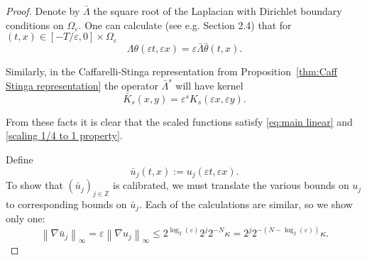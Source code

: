 \documentclass[11pt]{amsart}
\theoremstyle{remark}
\theoremstyle{definition}
\newcommand{\Z}{\mathbb{Z}}
\newcommand{\eps}{\varepsilon}
\newcommand{\norm}[1]{\left\lVert#1\right\rVert}
\newcommand{\del}{\partial}
\newcommand{\grad}{\nabla}
\begin{document}
\begin{proof}
Denote by $\bar{\Lambda}$ the square root of the Laplacian with Dirichlet boundary conditions on $\Omega_\eps$.  One can calculate (see e.g. \cite{CaSt} Section 2.4) that for $(t,x) \in [-T/\eps, 0]\times \Omega_\eps$
\[ \Lambda \theta(\eps t,\eps x) = \eps \bar{\Lambda} \bar{\theta}(t,x). \]

Similarly, in the Caffarelli-Stinga representation from Proposition~\ref{thm:Caff Stinga representation} the operator $\bar{\Lambda}^s$ will have kernel
\[ \bar{K}_s(x,y) = \eps^s K_s(\eps x,\eps y). \]

From these facts it is clear that the scaled functions satisfy \eqref{eq:main linear} and \eqref{scaling 1/4 to 1 property}.  

%

Define
\[ \bar{u}_j(t,x) := u_j(\eps t, \eps x). \]
To show that $(\bar{u}_j)_{j \in \Z}$ is calibrated, we must translate the various bounds on $u_j$ to corresponding bounds on $\bar{u}_j$.  Each of the calculations are similar, so we show only one:
\[ \norm{\grad \bar{u}_j}_\infty = \eps \norm{\grad u_j}_\infty \leq 2^{\log_2(\eps)} 2^j 2^{-N} \kappa = 2^j 2^{-(N-\log_2(\eps))} \kappa. \]

\end{proof}
\end{document}
